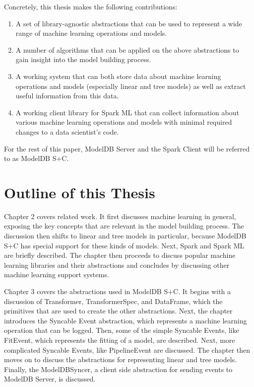Concretely, this thesis makes the following contributions:

\begin{enumerate}
  \item A set of library-agnostic abstractions that can be used to
    represent a wide range of machine learning operations and models.
  \item A number of algorithms that can be applied on the above abstractions
    to gain insight into the model building process.
  \item A working system that can both store data about 
    machine learning operations and models (especially linear and tree models) 
    as well as extract useful information from this data.
  \item A working client library for Spark ML that can collect information 
    about various  machine learning operations and models with 
    minimal required changes to a data scientist's code.
\end{enumerate}

For the rest of this paper, ModelDB Server and the Spark Client will be referred
to as ModelDB S+C.

\section{Outline of this Thesis}

Chapter 2 covers related work. It first discusses machine learning in general,
exposing the key concepts that are relevant in the model building process. The
discussion then shifts to linear and tree models in particular, because ModelDB S+C has 
special support for these kinds of models. 
Next, Spark and Spark ML are briefly described. The chapter then proceeds to discuss popular
machine learning libraries and their abstractions and concludes by discussing other machine
learning support systems.

Chapter 3 covers the abstractions used in ModelDB S+C.
It begins with a discussion of Transformer, TransformerSpec, and DataFrame, which 
the primitives that are used to create the other abstractions. Next, the chapter
introduces the Syncable Event abstraction, which represents a machine learning
operation that can be logged. Then, some of the simple Syncable Events, like FitEvent,
which represents the fitting of a model, are described. Next, more complicated Syncable
Events, like PipelineEvent are discussed. The chapter then moves on to discuss the
abstractions for representing linear and tree models. Finally, the ModelDBSyncer,
a client side abstraction for sending events to ModelDB Server, is discussed.

